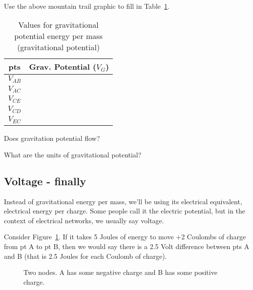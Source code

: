 \begin{blevel}
Use the above mountain trail graphic to fill in Table~\ref{T:2GP}.
\end{blevel}

\begin{table}[H]
\begin{center}
\begin{tabular}{|c|c|}\hline
pts&Grav. Potential ($V_G$)\\ \hline
$V_{AB}$& \\ \hline
$V_{AC}$& \\ \hline
$V_{CE}$& \\ \hline
$V_{CD}$& \\ \hline
$V_{EC}$& \\ \hline
\end{tabular}
\caption{Values for gravitational potential energy per mass (gravitational potential)}
\label{T:2GP}
\end{center}
\end{table}

\begin{clevel}
Does gravitation potential flow?
\end{clevel}

\begin{blevel}
What are the units of gravitational potential?
\end{blevel}

\subsection{Voltage - finally}
Instead of gravitational energy per mass, we'll be using its electrical equivalent, electrical energy per charge. Some people call it the electric potential, but in the context of electrical networks, we usually say voltage. \par

Consider Figure~\ref{F:2Va}. If it takes 5 Joules of energy to move +2 Coulombs of charge from pt A to pt B, then we would say there is a 2.5 Volt difference between pts A and B (that is 2.5 Joules for each Coulomb of charge).

\begin{figure}[H]
\begin{center}
\caption{Two nodes. A has some negative charge and B has some positive charge.}
\label{F:2Va}
\end{center}
\end{figure}

